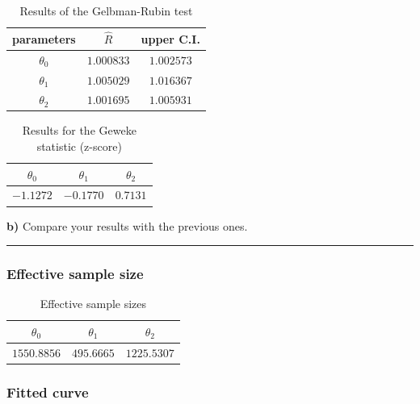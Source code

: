 \begin{table}[H]
	\centering\begin{tabular}{|c|c|c|} \hline 
		parameters & $\hat{R}$ & upper C.I. \\ \hline
		$\theta_0$ & $1.000833$ & $1.002573$ \\
		$\theta_1$ & $1.005029$ & $1.016367$ \\
		$\theta_2$ & $1.001695$ & $1.005931$ \\ \hline
	\end{tabular}
	\caption{Results of the Gelbman-Rubin test}
	\label{tab:metropolis-vw-gelman-rubin}
\end{table}

\begin{table}[H]
	\centering\begin{tabular}{|c|c|c|} \hline 
		$\theta_0$ & $\theta_1$ & $\theta_2$ \\ \hline 
		$-1.1272$   &   $-0.1770$	&   $0.7131$ \\ \hline
	\end{tabular}
	\caption{Results for the Geweke statistic (z-score)}
	\label{tab:metropolis-cw-geweke}
\end{table}

\textbf{b)} Compare your results with the previous ones.

\begin{center}\rule{6cm}{0.4pt}\end{center}

\subsubsection*{Effective sample size}

\begin{table}[H]
	\centering\begin{tabular}{|c|c|c|} \hline 
		$\theta_0$ & $\theta_1$ & $\theta_2$ \\ \hline 
		$1550.8856$  & $495.6665$ & $1225.5307$   \\ \hline
	\end{tabular}
	\caption{Effective sample sizes}
	\label{tab:metropolis-vw-effective-sample-sizes}
\end{table}

\subsubsection*{Fitted curve}

